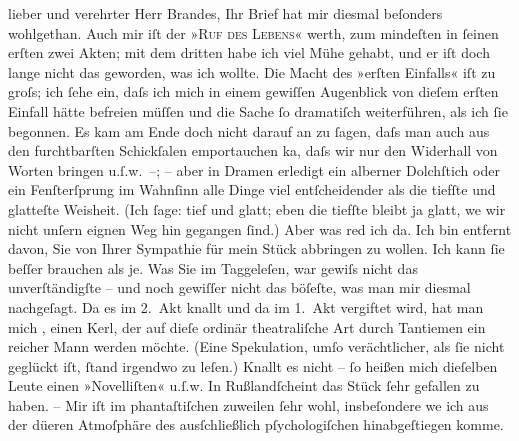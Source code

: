 \pstart{}lieber und verehrter Herr Brandes,\pend\vspace{0.5em}
\pstart
           Ihr Brief hat mir diesmal beſonders wohlgethan. Auch mir iſt der »\textsc{Ruf des Lebens}« werth, zum mindeſten in{ }ſeinen erſten zwei Akten; mit dem dritten habe ich
               viel Mühe gehabt, und er iſt doch lange nicht das geworden, was ich wollte. Die Macht
               des »erſten Einfalls« iſt zu groſs; ich{ }ſehe ein, daſs ich {\pb}mich in einem gewiſſen Augenblick von dieſem
               erſten Einfall hätte befreien \introOben{}müſſen\introOben{} und die Sache{ }ſo
               dramatiſch weiterführen, als ich{ }ſie begonnen. Es kam am Ende doch nicht darauf an zu{ }ſagen, daſs man auch aus den furchtbarſten Schickſalen emportauchen ka{\geminationn}, daſs wir nur den Widerhall von Worten bringen
               u.ſ.w. –; – aber in Dramen erledigt ein alberner Dolchſtich {\pb}oder ein Fenſterſprung im Wahnſinn alle Dinge viel
               entſcheidender als die tiefſte und glatteſte Weisheit. (Ich{ }ſage: tief und glatt;
               eben die tiefſte bleibt ja glatt, we{\geminationn} wir nicht unſern
               eignen Weg hin gegangen{ }ſind.) Aber was red ich da. Ich bin entfernt davon, Sie von
               Ihrer Sympathie für mein Stück abbringen zu wollen. Ich kann{ }ſie beſſer brauchen als
               je. Was Sie im Taggeleſen, war {\pb}gewiſs nicht das unverſtändigſte – und noch
               gewiſſer nicht das böſeſte, was man mir diesmal nachgeſagt. Da es im 2. Akt knallt
               und da im 1. Akt vergiftet wird, hat man mich \label{K_L01590-1v}\label{K_L01590-1}, einen Kerl, der auf dieſe ordinär
               theatraliſche Art durch Tantiemen ein reicher Mann werden möchte. (Eine Spekulation,
               umſo verächtlicher, als{ }ſie nicht geglückt iſt,{ }ſtand irgendwo zu {\pb}leſen.) Knallt es nicht –{ }ſo heißen mich dieſelben
               Leute einen »Novelliſten« u.ſ.w. In Rußlandſcheint das Stück{ }ſehr gefallen zu haben. – Mir iſt
               im phantaſtiſchen zuweilen{ }ſehr wohl, insbeſondere we{\geminationn}
               ich aus der dü{\geminationn}eren Atmoſphäre des ausſchließlich
               pſychologiſchen hinabgeſtiegen komme.\pend
           
